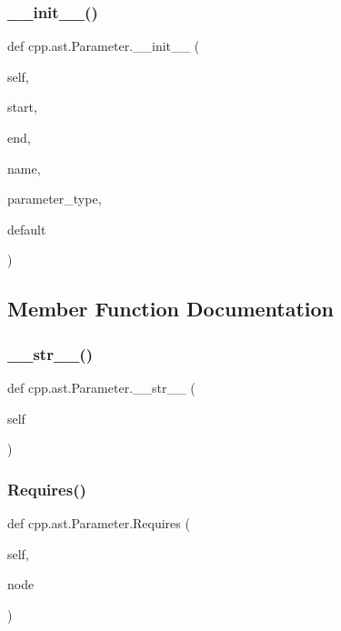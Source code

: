 \subsubsection{\texorpdfstring{\+\_\+\+\_\+init\+\_\+\+\_\+()}{\_\_init\_\_()}}
{\footnotesize\ttfamily def cpp.\+ast.\+Parameter.\+\_\+\+\_\+init\+\_\+\+\_\+ (\begin{DoxyParamCaption}\item[{}]{self,  }\item[{}]{start,  }\item[{}]{end,  }\item[{}]{name,  }\item[{}]{parameter\+\_\+type,  }\item[{}]{default }\end{DoxyParamCaption})}



\subsection{Member Function Documentation}
\mbox{\label{classcpp_1_1ast_1_1_parameter_aabfbabb3c744a0da4a012ceb4299947a}} 
\subsubsection{\texorpdfstring{\+\_\+\+\_\+str\+\_\+\+\_\+()}{\_\_str\_\_()}}
{\footnotesize\ttfamily def cpp.\+ast.\+Parameter.\+\_\+\+\_\+str\+\_\+\+\_\+ (\begin{DoxyParamCaption}\item[{}]{self }\end{DoxyParamCaption})}

\mbox{\label{classcpp_1_1ast_1_1_parameter_a4bc5c17a0d606d35be40cb4c2c1a67a6}} 
\subsubsection{\texorpdfstring{Requires()}{Requires()}}
{\footnotesize\ttfamily def cpp.\+ast.\+Parameter.\+Requires (\begin{DoxyParamCaption}\item[{}]{self,  }\item[{}]{node }\end{DoxyParamCaption})}



